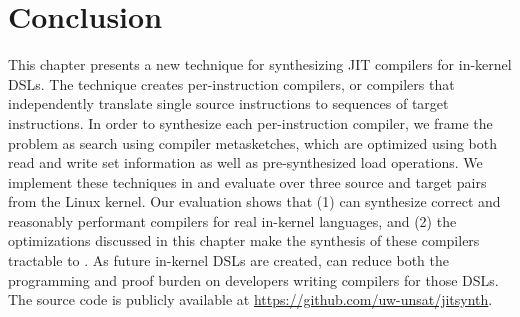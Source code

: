 \section{Conclusion}\label{jitsynth:s:conclusion}
This chapter presents a new technique for synthesizing JIT compilers for in-kernel
DSLs. The technique creates per-instruction compilers, or compilers that
independently translate single source instructions to sequences of target
instructions. In order to synthesize each per-instruction compiler, we frame the
problem as search using compiler metasketches, which are optimized using both
read and write set information as well as pre-synthesized load operations. We
implement these techniques in \jitsynth and evaluate \jitsynth over three source
and target pairs from the Linux kernel. Our evaluation shows that (1) \jitsynth
can synthesize correct and reasonably performant compilers for real in-kernel languages,
and (2) the optimizations discussed in this chapter make the synthesis of these
compilers tractable to \jitsynth. As future in-kernel DSLs are created,
\jitsynth can reduce both the programming and proof burden on developers writing
compilers for those DSLs. The \jitsynth source code is publicly available at
\url{https://github.com/uw-unsat/jitsynth}.
